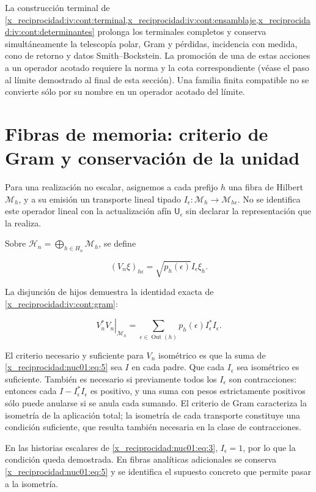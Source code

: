 La construcción terminal de \cref{x_reciprocidad:iv:cont:terminal,x_reciprocidad:iv:cont:ensamblaje,x_reciprocidad:iv:cont:determinantes} prolonga los terminales completos y conserva simultáneamente la telescopía polar, Gram y pérdidas, incidencia con medida, cono de retorno y datos Smith–Bockstein. La promoción de una de estas acciones a un operador acotado requiere la norma y la cota correspondiente (véase el paso al límite demostrado al final de esta sección). Una familia finita compatible no se convierte sólo por su nombre en un operador acotado del límite.

\section{Fibras de memoria: criterio de Gram y conservación de la unidad}

Para una realización no escalar, asignemos a cada prefijo \(h\) una fibra de Hilbert \(\mathscr M_h\), y a su emisión un transporte lineal tipado
\(I_\epsilon:\mathscr M_h\to\mathscr M_{h\epsilon}\). No se identifica este operador lineal con la actualización afín \(\mathsf U_\epsilon\) sin declarar la representación que la realiza.

Sobre \(\mathscr H_n=\bigoplus_{h\in H_n}\mathscr M_h\), se define

\[
(V_n\xi)_{h\epsilon}=\sqrt{p_h(\epsilon)}I_\epsilon\xi_h.
\]

La disjunción de hijos demuestra la identidad exacta de \cref{x_reciprocidad:iv:cont:gram}:

\begin{equation}
\left.V_n^*V_n\right|_{\mathscr M_h}
=\sum_{\epsilon\in\operatorname{Out}(h)}p_h(\epsilon)I_\epsilon^*I_\epsilon.
\label{x_reciprocidad:nuc01:eq:5}
\end{equation}

El criterio necesario y suficiente para \(V_n\) isométrico es que la suma de \eqref{x_reciprocidad:nuc01:eq:5} sea \(I\) en cada padre. Que cada \(I_\epsilon\) sea isométrico es suficiente. También es necesario si previamente todos los \(I_\epsilon\) son contracciones: entonces cada \(I-I_\epsilon^*I_\epsilon\) es positivo, y una suma con pesos estrictamente positivos sólo puede anularse si se anula cada sumando. El criterio de Gram caracteriza la isometría de la aplicación total; la isometría de cada transporte constituye una condición suficiente, que resulta también necesaria en la clase de contracciones.

En las historias escalares de \eqref{x_reciprocidad:nuc01:eq:3}, \(I_\epsilon=1\), por lo que la condición queda demostrada. En fibras analíticas adicionales se conserva \eqref{x_reciprocidad:nuc01:eq:5} y se identifica el supuesto concreto que permite pasar a la isometría.

